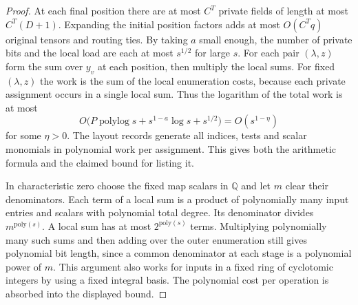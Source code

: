 \begin{proof}
At each final position there are at most $C^T$ private fields of
length at most $C^T(D+1)$. Expanding the initial position factors
adds at most $O(C^T q)$ original tensors and routing ties. By taking
$a$ small enough, the number of private bits and the local load are
each at most $s^{1/2}$ for large $s$. For each pair $(\lambda,z)$
form the sum over $y_v$ at each position, then multiply the local
sums. For fixed $(\lambda,z)$ the work is the sum of the local enumeration
costs, because each private assignment occurs in a single local sum.
Thus the logarithm of the total work is at most
\[
 O\bigl(P\operatorname{polylog}s+s^{1-a}\log s+s^{1/2}\bigr)
       =O(s^{1-\eta})
\]
for some $\eta>0$. The layout records generate all indices, tests
and scalar monomials in polynomial work per assignment. This gives
both the arithmetic formula and the claimed bound for listing it.

In characteristic zero choose the fixed map scalars in $\mathbb Q$
and let $m$ clear their denominators. Each term of a local sum is
a product of polynomially many input entries and scalars with
polynomial total degree. Its denominator divides $m^{\mathrm{poly}(s)}$.
A local sum has at most $2^{\mathrm{poly}(s)}$ terms. Multiplying
polynomially many such sums and then adding over the outer enumeration
still gives polynomial bit length, since a common denominator at each
stage is a polynomial power of $m$. This argument also works for
inputs in a fixed ring of cyclotomic integers by using a fixed
integral basis. The polynomial cost per operation is absorbed into
the displayed bound.
\end{proof}
